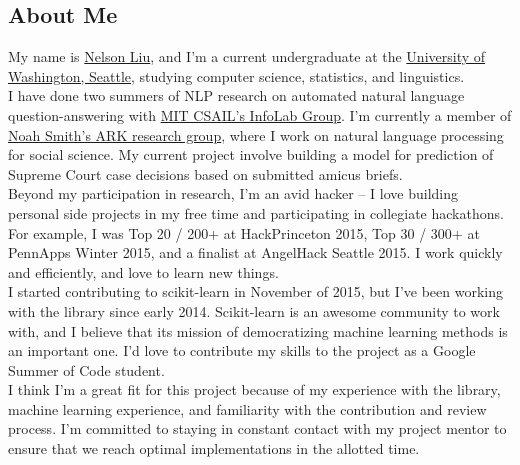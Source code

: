 \documentclass[12pt, oneside]{article}
\begin{document}
\subsection{About Me}
My name is \href{http://nelsonliu.me/}{Nelson Liu}, and I'm a current
undergraduate at the \href{http://www.washington.edu/}{University of
  Washington, Seattle}, studying computer science,
statistics, and linguistics. \\
I have done two summers of NLP research on automated natural language
question-answering with
\href{http://groups.csail.mit.edu/infolab/}{MIT CSAIL's InfoLab
  Group}. I'm currently a member of
\href{http://www.ark.cs.washington.edu/}{Noah Smith's ARK research
  group}, where I work on natural language processing for social
science. My current project involve building a model for prediction of
Supreme Court case decisions based
on submitted amicus briefs.\\
Beyond my participation in research, I'm an avid hacker -- I love
building personal side projects in my free time and participating in
collegiate hackathons. For example, I was Top 20 / 200+ at
HackPrinceton 2015, Top 30 / 300+ at PennApps Winter 2015, and a
finalist at AngelHack Seattle 2015. I work quickly and efficiently,
and love to learn new things.\\
I started contributing to scikit-learn in November of 2015, but I've
been working with the library since early 2014. Scikit-learn is an
awesome community to work with, and I believe that its mission of
democratizing machine learning methods is an important one. I'd love
to contribute my skills to the project as a Google Summer
of Code student.\\
I think I'm a great fit for this project because of my experience with
the library, machine learning experience, and familiarity with the
contribution and review process. I'm committed to staying in constant
contact with my project mentor to ensure that we reach optimal
implementations in the allotted time.
\end{document}
